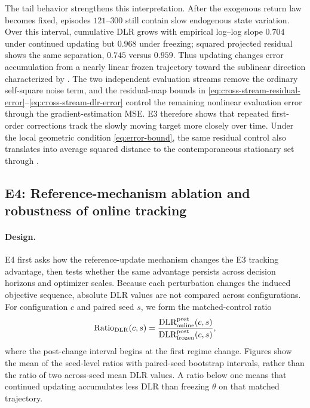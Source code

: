 The tail behavior strengthens this interpretation.  After the exogenous return law becomes fixed, episodes $121$--$300$ still contain slow endogenous state variation.  Over this interval, cumulative DLR grows with empirical log--log slope $0.704$ under continued updating but $0.968$ under freezing; squared projected residual shows the same separation, $0.745$ versus $0.959$.  Thus updating changes error accumulation from a nearly linear frozen trajectory toward the sublinear direction characterized by .  The two independent evaluation streams remove the ordinary self-square noise term, and the residual-map bounds in \eqref{eq:cross-stream-residual-error}--\eqref{eq:cross-stream-dlr-error} control the remaining nonlinear evaluation error through the gradient-estimation MSE.  E3 therefore shows that repeated first-order corrections track the slowly moving target more closely over time.  Under the local geometric condition \eqref{eq:error-bound}, the same residual control also translates into average squared distance to the contemporaneous stationary set through .

\FloatBarrier

\subsection{E4: Reference-mechanism ablation and robustness of online tracking}\label{sec:e4}
\paragraph{Design.}
E4 first asks how the reference-update mechanism changes the E3 tracking advantage, then tests whether the same advantage persists across decision horizons and optimizer scales.  Because each perturbation changes the induced objective sequence, absolute DLR values are not compared across configurations.  For configuration $c$ and paired seed $s$, we form the matched-control ratio
\[
\mathrm{Ratio}_{\mathrm{DLR}}(c,s)
=\frac{\mathrm{DLR}^{\rm post}_{\rm online}(c,s)}{\mathrm{DLR}^{\rm post}_{\rm frozen}(c,s)},
\]
where the post-change interval begins at the first regime change.  Figures show the mean of the seed-level ratios with paired-seed bootstrap intervals, rather than the ratio of two across-seed mean DLR values.  A ratio below one means that continued updating accumulates less DLR than freezing $\theta$ on that matched trajectory.

